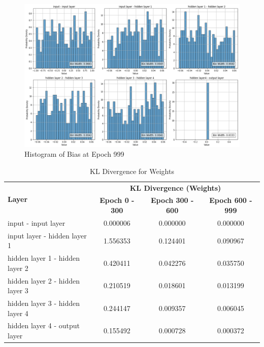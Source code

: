 \documentclass{ioereport}
\begin{document}
    \begin{figure}[H]
        \centering
        \includegraphics[width=\linewidth]{assets/audio histogram/epoch999Bias.png}
        \caption{Histogram of Bias at Epoch 999}
        \label{fig:audio-bias-999}
    \end{figure}

    \begin{table}[H]
    \centering
    \begin{tabular}{|l|c|c|c|}
    \hline
    \multirow{2}{*}{\textbf{Layer}} & \multicolumn{3}{|c|}{\textbf{KL Divergence (Weights)}} \\
    \cline{2-4}
    & \textbf{Epoch 0 - 300} & \textbf{Epoch 300 - 600} & \textbf{Epoch 600 - 999} \\
    \hline
    input - input layer & 0.000006 & 0.000000 & 0.000000 \\
    input layer - hidden layer 1 & 1.556353 & 0.124401 & 0.090967 \\
    hidden layer 1 - hidden layer 2 & 0.420411 & 0.042276 & 0.035750 \\
    hidden layer 2 - hidden layer 3 & 0.210519 & 0.018601 & 0.013199 \\
    hidden layer 3 - hidden layer 4 & 0.244147 & 0.009357 & 0.006045 \\
    hidden layer 4 - output layer & 0.155492 & 0.000728 & 0.000372 \\
    \hline
    \end{tabular}
    \caption{KL Divergence for Weights}
    \end{table}
\end{document}

